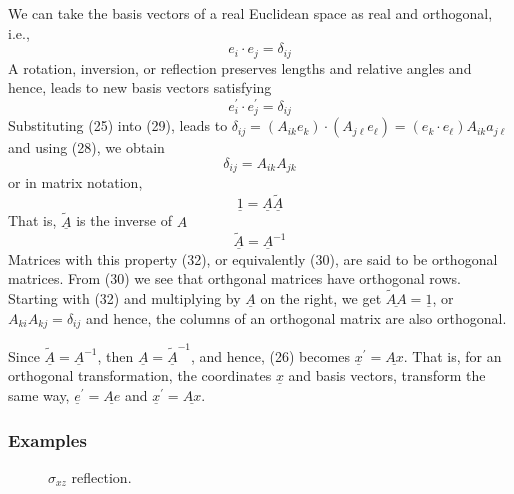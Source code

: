 We can take the basis vectors of a real Euclidean space as real and 
orthogonal, i.e.,
\begin{equation}
e_i \cdot e_j = \delta_{ij}
\label{chap16app-eqno28}
\end{equation}
A rotation, inversion, or reflection preserves lengths and relative 
angles and hence, leads to new basis vectors satisfying
\begin{equation}
e_i^{\prime} \cdot e^{\prime}_j = \delta_{ij}
\label{chap16app-eqno29}
\end{equation}
Substituting (25) into (29), leads to
$\delta_{ij} = \left( A_{ik} e_k \right) \cdot \left( A_{j \ell} 
e_{\ell} \right) = \left( e_k \cdot e_{\ell} \right) A_{ik} a_{j\ell}$
and using (28), we obtain
\begin{equation}
\delta_{ij} = A_{ik} A_{jk}
\label{chap16app-eqno30}
\end{equation}
or in matrix notation,
\begin{equation}
\underline{1} = \underline{A}\underline{\tilde{A}}
\label{chap16app-eqno31}
\end{equation}
That is, $\underline{\tilde{A}}$ is the inverse of $A$
\begin{equation}
\underline{\tilde{A}} = \underline{A}^{-1}
\label{chap16app-eqno32}
\end{equation}
Matrices with this property (32), or equivalently (30), are said to be 
orthogonal matrices.  From (30) we see that orthgonal matrices have 
orthogonal rows.  Starting with (32) and multiplying by 
$\underline{A}$ on the right, we get $\underline{\tilde{A}A} = 
\underline{1}$, or $A_{ki}A_{kj} = \delta_{ij}$ and hence, the 
columns of an orthogonal matrix are also orthogonal.

Since $\underline{\tilde{A}} = \underline{A}^{-1}$, then 
$\underline{A} = \underline{\tilde{A}}^{-1}$, and hence, (26) 
becomes $\underline{x}^{\prime} = \underline{Ax}$.  That is, for an 
orthogonal transformation, the coordinates $\underline{x}$ and basis 
vectors, transform the same way, $\underline{e}^{\prime} = 
\underline{Ae}$ and $\underline{x}^{\prime} = \underline{Ax}$.

\subsubsection{Examples}

\begin{figure}
\caption{$\sigma_{xz}$ reflection.}
\label{chap16app-fig2}
\end{figure}

